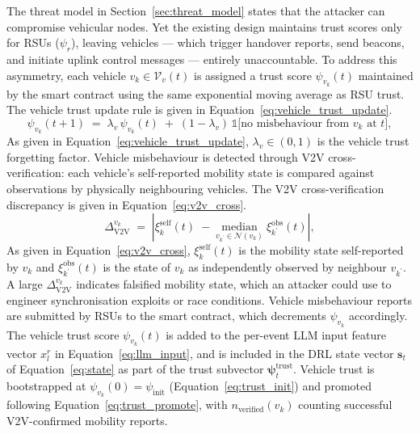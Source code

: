 The threat model in Section~\ref{sec:threat_model} states that
the attacker can compromise vehicular nodes. Yet the existing
design maintains trust scores only for RSUs ($\psi_r$), leaving
vehicles --- which trigger handover reports, send beacons, and
initiate uplink control messages --- entirely unaccountable. To
address this asymmetry, each vehicle $v_k \in \mathcal{V}_v(t)$
is assigned a trust score $\psi_{v_k}(t)$ maintained by the
smart contract using the same exponential moving average as RSU
trust. The vehicle trust update rule is given in
Equation~\eqref{eq:vehicle_trust_update}.
%
\begin{equation}
  \psi_{v_k}(t{+}1) \;=\;
    \lambda_v\,\psi_{v_k}(t)
    \;+\;
    (1-\lambda_v)\,
    \mathbb{1}\bigl[
      \text{no misbehaviour from } v_k \text{ at } t
    \bigr],
  \label{eq:vehicle_trust_update}
\end{equation}
%
As given in Equation~\eqref{eq:vehicle_trust_update},
$\lambda_v \in (0,1)$ is the vehicle trust forgetting factor.
Vehicle misbehaviour is detected through V2V cross-verification:
each vehicle's self-reported mobility state is compared against
observations by physically neighbouring vehicles. The
V2V cross-verification discrepancy is given in
Equation~\eqref{eq:v2v_cross}.
%
\begin{equation}
  \Delta_{\mathrm{V2V}}^{v_k} \;=\;
    \left|
      \xi_k^{\mathrm{self}}(t)
      \;-\;
      \underset{v_{k^{\prime}} \in \mathcal{N}(v_k)}{\mathrm{median}}\;
      \xi_{k^{\prime}}^{\mathrm{obs}}(t)
    \right|,
  \label{eq:v2v_cross}
\end{equation}
%
As given in Equation~\eqref{eq:v2v_cross},
$\xi_k^{\mathrm{self}}(t)$ is the mobility state self-reported
by $v_k$ and $\xi_{k^{\prime}}^{\mathrm{obs}}(t)$ is the state
of $v_k$ as independently observed by neighbour $v_{k^{\prime}}$.
A large $\Delta_{\mathrm{V2V}}^{v_k}$ indicates falsified
mobility state, which an attacker could use to engineer
synchronisation exploits or race conditions. Vehicle misbehaviour
reports are submitted by RSUs to the smart contract, which
decrements $\psi_{v_k}$ accordingly. The vehicle trust score
$\psi_{v_k}(t)$ is added to the per-event LLM input feature
vector $x_l^r$ in Equation~\eqref{eq:llm_input}, and is included
in the DRL state vector $\mathbf{s}_t$ of
Equation~\eqref{eq:state} as part of the trust subvector
$\boldsymbol{\psi}_t^{\mathrm{trust}}$. Vehicle trust is
bootstrapped at $\psi_{v_k}(0) = \psi_{\mathrm{init}}$
(Equation~\eqref{eq:trust_init}) and promoted following
Equation~\eqref{eq:trust_promote}, with
$n_{\mathrm{verified}}(v_k)$ counting successful V2V-confirmed
mobility reports.


